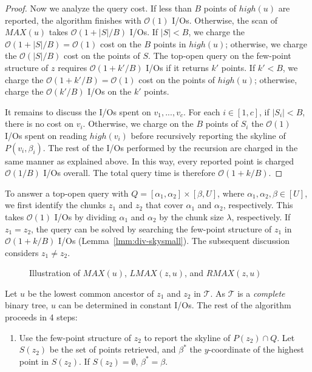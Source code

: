 \documentclass{sig-alternate}
\DeclareMathOperator*{\intr}{\cap}
\def\figcapup{\vspace{-1mm}}
\def\figcapdown{\vspace{-2mm}}
\def\high{\mathit{high}}
\def\MAX{\mathit{MAX}}
\def\intr{\cap}
\def\T{\mathcal{T}}
\newcommand{\arxivexcl}[2]{\ifthenelse{\boolean{arxivversion}}{#1}{#2}}
\newcommand{\bigO}{\mathcal{O}}
\renewcommand{\(}{\left(}
\renewcommand{\)}{\right)}
\newcommand{\yufeigraphics}[2]{
  \arxivexcl
   {\texttt{[image: ./\#2]}}
   {\texttt{[image: ./figure/\#2]}}
}
\begin{document}
\begin{fullenv}
\begin{proof}
  Now we analyze the query cost. If less than $B$ points of $\high(u)$ are
  reported, the algorithm finishes with $\bigO(1)$ I/Os. Otherwise, the scan of
  $\MAX(u)$ takes $\bigO(1 + |S|/B)$ I/Os. If $|S| < B$, we charge the $\bigO(1
  + |S|/B) = \bigO(1)$ cost on the $B$ points in $\high(u)$; otherwise, we
  charge the $\bigO(|S|/B)$ cost on the points of $S$. The top-open query on
  the few-point structure of $z$ requires $\bigO(1 + k'/B)$ I/Os if it returns
  $k'$ points. If $k' < B$, we charge the $\bigO(1 + k'/B) = \bigO(1)$ cost on
  the points of $\high(u)$; otherwise, charge the $\bigO(k'/B)$ I/Os on the
  $k'$ points.

  It remains to discuss the I/Os spent on $v_1, ..., v_c$. For each $i \in [1,
  c]$, if $|S_i| < B$, there is no cost on $v_i$. Otherwise, we charge on the
  $B$ points of $S_i$ the $\bigO(1)$ I/Os spent on reading $\high(v_i)$ before
  recursively reporting the skyline of $P(v_i, \beta_i)$. The rest of the I/Os
  performed by the recursion are charged in the same manner as explained above.
  In this way, every reported point is charged $\bigO(1/B)$ I/Os overall. The
  total query time is therefore $\bigO(1 + k/B)$.
\end{proof}

To answer a top-open query with $Q = [\alpha_1, \alpha_2] \times [\beta, U]$,
where $\alpha_1, \alpha_2, \beta \in [U]$, we first identify the chunks $z_1$
and $z_2$ that cover $\alpha_1$ and $\alpha_2$, respectively. This takes
$\bigO(1)$ I/Os by dividing $\alpha_1$ and $\alpha_2$ by the chunk size
$\lambda$, respectively. If $z_1 = z_2$, the query can be solved by searching
the few-point structure of $z_1$ in $\bigO(1 + k/B)$ I/Os
(Lemma~\ref{lmm:div-skysmall}). The subsequent discussion considers $z_1 \neq
z_2$.

\begin{figure}
	\centering
    \yufeigraphics{height=45mm}{max-u}
	\figcapup
	\caption{\boldmath Illustration of $MAX(u)$, $LMAX(z, u)$, and $RMAX(z, u)$}
	\label{fig:div-max}
	\figcapdown
\end{figure}

Let $u$ be the lowest common ancestor of $z_1$ and $z_2$ in $\T$. As $\T$ is a
{\em complete} binary tree, $u$ can be determined in constant I/Os. The rest of
the algorithm proceeds in 4 steps:

\begin{enumerate}
  \item Use the few-point structure of $z_2$ to report the skyline of $P(z_2)
    \intr Q$. Let $S(z_2)$ be the set of points retrieved, and $\beta^*$ the
    $y$-coordinate of the highest point in $S(z_2)$. If $S(z_2) = \emptyset$,
    $\beta^* = \beta$.


\end{enumerate}
\end{fullenv}
\end{document}
